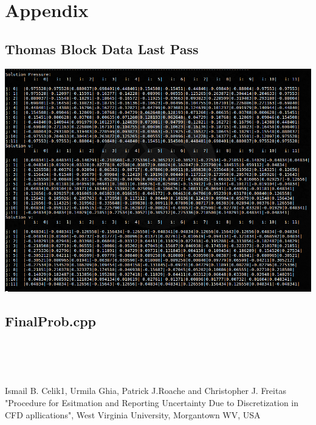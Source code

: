 \documentclass[paper=a4, fontsize=11pt, abstract=on]{scrartcl}
\numberwithin{equation}{section}		%
\numberwithin{figure}{section}			%
\numberwithin{table}{section}				%
\begin{document}
\newpage
\appendix
\section{Appendix} \label{App:Appendix}
\subsection{Thomas Block Data Last Pass}
\includegraphics[width=0.95\linewidth]{tom}

\subsection{FinalProb.cpp}
\begin{lstlisting}




\end{lstlisting}

\begin{thebibliography}{99} %
Ismail B. Celik1, Urmila Ghia, Patrick J.Roache and Christopher J. Freitas
\newblock "Procedure for Esitmation and Reporting Uncertainty Due to Discretization in CFD apllications",  West Virginia University, Morgantown WV, USA

\end{thebibliography}


\end{document}
